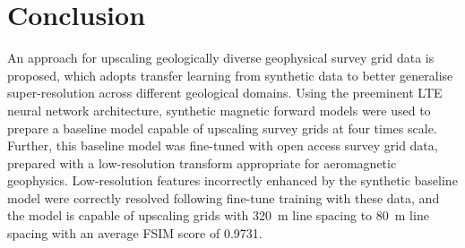 \section{Conclusion}
\label{sec:2conclusion}
An approach for upscaling geologically diverse geophysical survey grid data is proposed, which adopts transfer learning from synthetic data to better generalise super-resolution across different geological domains.
Using the preeminent LTE neural network architecture, synthetic magnetic forward models were used to prepare a baseline model capable of upscaling survey grids at four times scale.
Further, this baseline model was fine-tuned with open access survey grid data, prepared with a low-resolution transform appropriate for aeromagnetic geophysics.
Low-resolution features incorrectly enhanced by the synthetic baseline model were correctly resolved following fine-tune training with these data, and the model is capable of upscaling grids with \qty{320}{\m} line spacing to \qty{80}{\m} line spacing with an average FSIM score of \num{0.9731}.


\printbibliography{}


% 